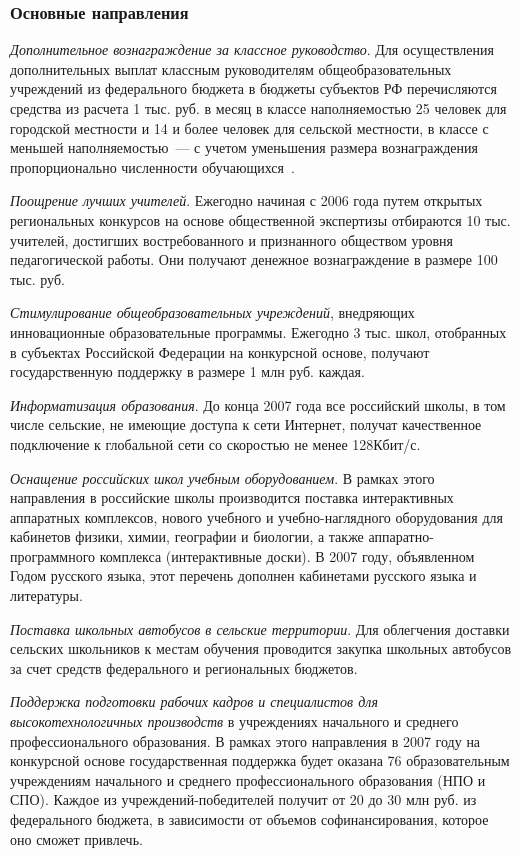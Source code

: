 \documentclass[article, 12pt, russian, oneside]{ncc}
\begin{document}
\subsubsection{Основные направления}

\emph{Дополнительное вознаграждение за классное руководство}. Для
осуществления дополнительных выплат классным руководителям
общеобразовательных учреждений из федерального бюджета в бюджеты
субъектов РФ перечисляются средства из расчета 1 тыс. руб. в месяц в
классе наполняемостью 25 человек для городской местности и 14 и более
человек для сельской местности, в классе с меньшей наполняемостью~---
с учетом уменьшения размера вознаграждения пропорционально численности
обучающихся~\cite{Edu_Goals}.

\emph{Поощрение лучших учителей}. Ежегодно начиная с 2006 года путем
открытых региональных конкурсов на основе общественной экспертизы
отбираются 10 тыс. учителей, достигших востребованного и признанного
обществом уровня педагогической работы. Они получают денежное
вознаграждение в размере 100 тыс. руб.

\emph{Стимулирование общеобразовательных учреждений}, внедряющих
инновационные образовательные программы. Ежегодно 3 тыс. школ,
отобранных в субъектах Российской Федерации на конкурсной основе,
получают государственную поддержку в размере 1 млн руб. каждая.

\emph{Информатизация образования}. До конца 2007 года все российский
школы, в том числе сельские, не имеющие доступа к сети Интернет,
получат качественное подключение к глобальной сети со скоростью не
менее 128Кбит/с.

\emph{ Оснащение российских школ учебным оборудованием}. В рамках
этого направления в российские школы производится поставка
интерактивных аппаратных комплексов, нового учебного и
учебно-наглядного оборудования для кабинетов физики, химии, географии
и биологии, а также аппаратно-программного комплекса (интерактивные
доски). В 2007 году, объявленном Годом русского языка, этот перечень
дополнен кабинетами русского языка и литературы.

\emph{Поставка школьных автобусов в сельские территории}. Для
облегчения доставки сельских школьников к местам обучения проводится
закупка школьных автобусов за счет средств федерального и региональных
бюджетов.

\emph{Поддержка подготовки рабочих кадров и специалистов для
  высокотехнологичных производств} в учреждениях начального и среднего
профессионального образования. В рамках этого направления в 2007 году
на конкурсной основе государственная поддержка будет оказана 76
образовательным учреждениям начального и среднего профессионального
образования (НПО и СПО). Каждое из учреждений-победителей получит от
20 до 30 млн руб. из федерального бюджета, в зависимости от объемов
софинансирования, которое оно сможет привлечь.
\end{document}
